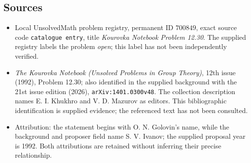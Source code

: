 \documentclass[11pt]{article}
\begin{document}
\subsection{Sources}
\begin{itemize}
\item Local UnsolvedMath problem registry, permanent ID \(700849\), exact source code \texttt{catalogue entry}, title \emph{Kourovka Notebook Problem 12.30}. The supplied registry labels the problem \emph{open}; this label has not been independently verified.
\item \emph{The Kourovka Notebook (Unsolved Problems in Group Theory)}, 12th issue (1992), Problem 12.30; also identified in the supplied background with the 21st issue edition (2026), \texttt{arXiv:1401.0300v48}. The collection description names E. I. Khukhro and V. D. Mazurov as editors. This bibliographic identification is supplied evidence; the referenced text has not been consulted.
\item Attribution: the statement begins with O. N. Golovin's name, while the background and proposer field name S. V. Ivanov; the supplied proposal year is 1992. Both attributions are retained without inferring their precise relationship.
\end{itemize}
\end{document}

